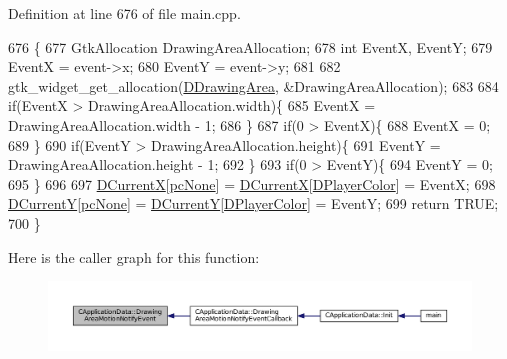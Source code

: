 Definition at line 676 of file main.\+cpp.


\begin{DoxyCode}
676                                                                                                \{
677     GtkAllocation DrawingAreaAllocation;
678     \textcolor{keywordtype}{int} EventX, EventY;
679     EventX = \textcolor{keyword}{event}->x;
680     EventY = \textcolor{keyword}{event}->y;
681 
682     gtk\_widget\_get\_allocation(\hyperlink{classCApplicationData_a4735f5d31632313e0b2a1659eb178987}{DDrawingArea}, &DrawingAreaAllocation);
683     
684     \textcolor{keywordflow}{if}(EventX > DrawingAreaAllocation.width)\{
685         EventX = DrawingAreaAllocation.width - 1;
686     \}
687     \textcolor{keywordflow}{if}(0 > EventX)\{
688         EventX = 0;   
689     \}
690     \textcolor{keywordflow}{if}(EventY > DrawingAreaAllocation.height)\{
691         EventY = DrawingAreaAllocation.height - 1;
692     \}
693     \textcolor{keywordflow}{if}(0 > EventY)\{
694         EventY = 0;   
695     \}
696 
697     \hyperlink{classCApplicationData_a1dc7ee482a39f7978c71365ac540f97a}{DCurrentX}[\hyperlink{GameDataTypes_8h_aafb0ca75933357ff28a6d7efbdd7602fa88767aa8e02c7b3192bbab4127b3d729}{pcNone}] = \hyperlink{classCApplicationData_a1dc7ee482a39f7978c71365ac540f97a}{DCurrentX}[\hyperlink{classCApplicationData_a53550939b20cba70570f113e4d1c5d02}{DPlayerColor}] = EventX;
698     \hyperlink{classCApplicationData_a0ba39779ae11c8072258c6ddfebd6052}{DCurrentY}[\hyperlink{GameDataTypes_8h_aafb0ca75933357ff28a6d7efbdd7602fa88767aa8e02c7b3192bbab4127b3d729}{pcNone}] = \hyperlink{classCApplicationData_a0ba39779ae11c8072258c6ddfebd6052}{DCurrentY}[\hyperlink{classCApplicationData_a53550939b20cba70570f113e4d1c5d02}{DPlayerColor}] = EventY;
699     \textcolor{keywordflow}{return} TRUE;
700 \}
\end{DoxyCode}
Here is the caller graph for this function\+:\nopagebreak
\begin{figure}[H]
\begin{center}
\leavevmode
\includegraphics[width=350pt]{classCApplicationData_a9b53201c01b399df18b02d1e93213e45_icgraph}
\end{center}
\end{figure}
\hypertarget{classCApplicationData_a463a4bc8eabe67f9f22c46d96f5eff88}{}\label{classCApplicationData_a463a4bc8eabe67f9f22c46d96f5eff88} 
